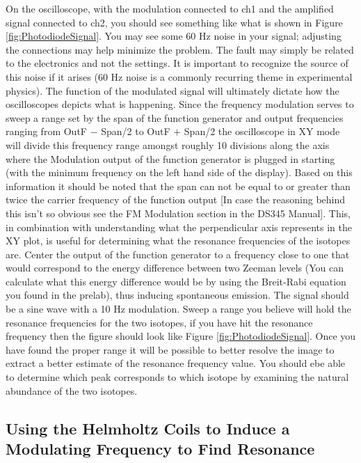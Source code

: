 \documentclass{../lab}
\begin{document}
On the oscilloscope, with the modulation connected to ch1 and the amplified signal connected to ch2, you should see something like what is shown in Figure \ref{fig:PhotodiodeSignal}. You may see some 60 Hz noise in your signal; adjusting the connections may help minimize the problem. The fault may simply be related to the electronics and not the settings. It is important to recognize the source of this noise if it arises (60 Hz noise is a commonly recurring theme in experimental physics). The function of the modulated signal will ultimately dictate how the oscilloscopes depicts what is happening. Since the frequency modulation serves to sweep a range set by the span of the function generator and output frequencies ranging from OutF $−$ Span/2 to OutF $+$ Span/2 the oscilloscope in XY mode will divide this frequency range amongst roughly 10 divisions along the axis where the Modulation output of the function generator is plugged in starting (with the minimum frequency on the left hand side of the display). Based on this information it should be noted that the span can not be equal to or greater than twice the carrier frequency of the function output [In case the reasoning behind this isn't so obvious see the  FM Modulation section in the DS345 Manual]. This, in combination with understanding what the perpendicular axis represents in the XY plot, is useful for determining what the resonance frequencies of the isotopes are. Center the output of the function generator to a frequency close to one that would correspond to the energy difference between two Zeeman levels (You can calculate what this energy difference would be by using the Breit-Rabi equation you found in the prelab), thus inducing spontaneous emission. The signal should be a sine wave with a 10 Hz modulation. Sweep a range you believe will hold the resonance frequencies for the two isotopes, if you have hit the resonance frequency then the figure should look like Figure \ref{fig:PhotodiodeSignal}. Once you have found the proper range it will be possible to better resolve the image to extract a better estimate of the resonance frequency value. You should ebe able to determine which peak corresponds to which isotope by examining the natural abundance of the two isotopes.

\subsection{Using the Helmholtz Coils to Induce a Modulating Frequency to Find Resonance}
\end{document}
